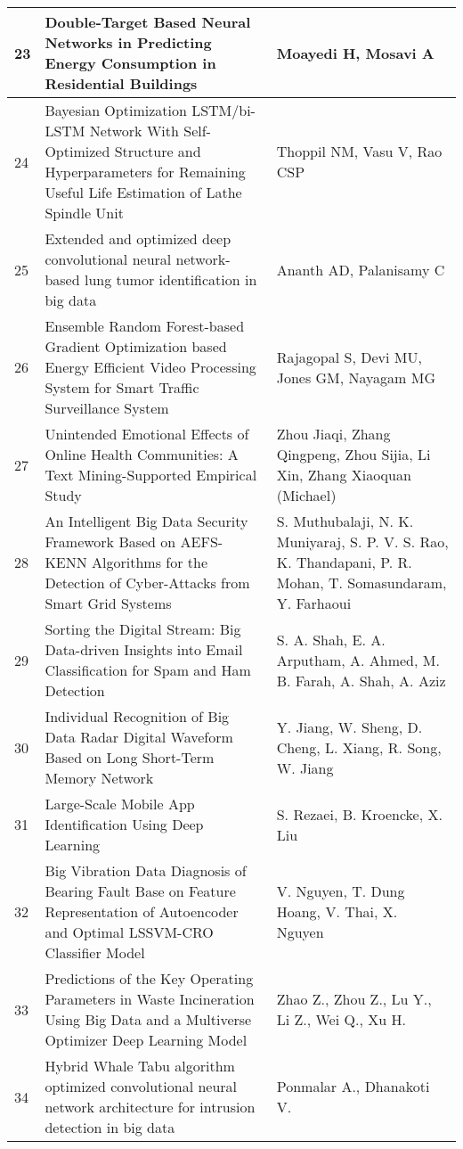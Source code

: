 \begin{landscape}
\begin{longtable}{|p{0.5cm}|p{9cm}|p{7cm}|}
    \hline
    23 & Double-Target Based Neural Networks in Predicting Energy Consumption in Residential Buildings & Moayedi H, Mosavi A \\
    \hline
    24 & Bayesian Optimization LSTM/bi-LSTM Network With Self-Optimized Structure and Hyperparameters for Remaining Useful Life Estimation of Lathe Spindle Unit & Thoppil NM, Vasu V, Rao CSP \\
    \hline
    25 & Extended and optimized deep convolutional neural network-based lung tumor identification in big data & Ananth AD, Palanisamy C \\
    \hline
    26 & Ensemble Random Forest-based Gradient Optimization based Energy Efficient Video Processing System for Smart Traffic Surveillance System & Rajagopal S, Devi MU, Jones GM, Nayagam MG \\
    \hline
    27 & Unintended Emotional Effects of Online Health Communities: A Text Mining-Supported Empirical Study & Zhou Jiaqi, Zhang Qingpeng, Zhou Sijia, Li Xin, Zhang Xiaoquan (Michael) \\
    \hline
    28 & An Intelligent Big Data Security Framework Based on AEFS-KENN Algorithms for the Detection of Cyber-Attacks from Smart Grid Systems & S. Muthubalaji, N. K. Muniyaraj, S. P. V. S. Rao, K. Thandapani, P. R. Mohan, T. Somasundaram, Y. Farhaoui \\
    \hline
    29 & Sorting the Digital Stream: Big Data-driven Insights into Email Classification for Spam and Ham Detection & S. A. Shah, E. A. Arputham, A. Ahmed, M. B. Farah, A. Shah, A. Aziz \\
    \hline
    30 & Individual Recognition of Big Data Radar Digital Waveform Based on Long Short-Term Memory Network & Y. Jiang, W. Sheng, D. Cheng, L. Xiang, R. Song, W. Jiang \\
    \hline
    31 & Large-Scale Mobile App Identification Using Deep Learning & S. Rezaei, B. Kroencke, X. Liu \\
    \hline
    32 & Big Vibration Data Diagnosis of Bearing Fault Base on Feature Representation of Autoencoder and Optimal LSSVM-CRO Classifier Model & V. Nguyen, T. Dung Hoang, V. Thai, X. Nguyen \\
    \hline
    33 & Predictions of the Key Operating Parameters in Waste Incineration Using Big Data and a Multiverse Optimizer Deep Learning Model & Zhao Z., Zhou Z., Lu Y., Li Z., Wei Q., Xu H. \\
    \hline
    34 & Hybrid Whale Tabu algorithm optimized convolutional neural network architecture for intrusion detection in big data & Ponmalar A., Dhanakoti V. \\

\end{longtable}
\end{landscape}
